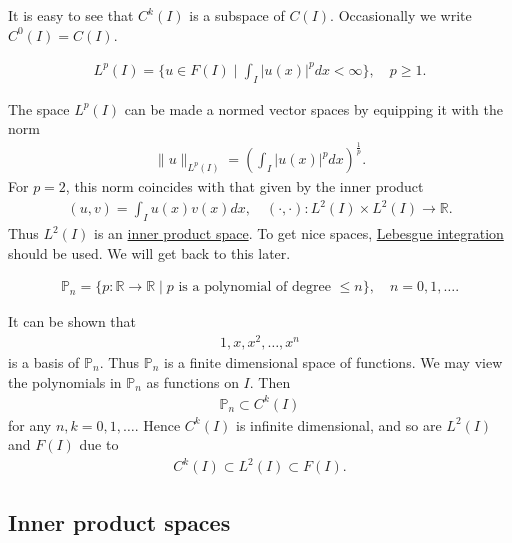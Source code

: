 \documentclass[12pt,oneside,final]{amsart}
\def\R{\mathbb R}
\begin{document}
It is easy to see that $C^k(I)$ is a subspace of $C(I)$. Occasionally we write $C^0(I) = C(I)$.

\begin{definition}
    \begin{align*}
L^p(I) = \{u \in F(I) \mid \int_I |u(x)|^p dx < \infty \}, 
\quad p \ge 1.
    \end{align*}
\end{definition}

The space $L^p(I)$ can be made a normed vector spaces by equipping it with the norm 
    \begin{align*}
\|u\|_{L^p(I)} = \left( \int_I |u(x)|^p dx \right)^{\frac1p}.
    \end{align*}
For $p=2$, this norm coincides with that given by the inner product
    \begin{align*}
(u, v) = \int_I u(x) v(x) dx, \quad (\cdot, \cdot) : L^2(I) \times L^2(I) \to \mathbb R.
    \end{align*}
Thus $L^2(I)$ is an \href{https://en.wikipedia.org/wiki/Inner_product_space}{inner product space}.
To get nice spaces, \href{https://en.wikipedia.org/wiki/Lebesgue_integration}{Lebesgue integration} should be used. We will get back to this later.

\begin{definition}
    \begin{align*}
\mathbb P_n = \{p : \R \to \R \mid \text{$p$ is a polynomial of degree $\le n$}\}, \quad n = 0, 1, \dots.
    \end{align*}
\end{definition}

It can be shown that 
    \begin{align*}
1, x, x^2, \dots, x^n
    \end{align*}
is a basis of $\mathbb P_n$. Thus $\mathbb P_n$ is a finite dimensional space of functions. 
We may view the polynomials in $\mathbb P_n$ as functions on $I$. Then
    \begin{align*}
\mathbb P_n \subset C^k(I)
    \end{align*}
for any $n,k=0,1,\dots$. Hence $C^k(I)$ is infinite dimensional,
and so are $L^2(I)$ and $F(I)$ due to 
    \begin{align*}
C^k(I) \subset L^2(I) \subset F(I).
    \end{align*}

\subsection{Inner product spaces}
\end{document}
